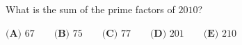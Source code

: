 What is the sum of the prime factors of $2010$?

$\textbf{(A) } 67\qquad\textbf{(B) } 75\qquad\textbf{(C) } 77\qquad\textbf{(D) } 201\qquad\textbf{(E) } 210$

